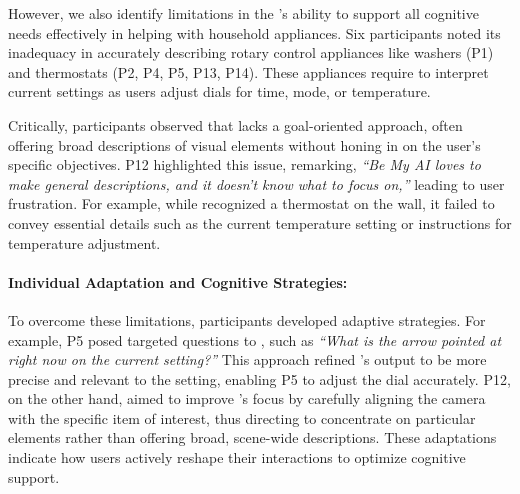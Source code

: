 



However, we also identify limitations in the \bma’s ability to support all cognitive needs effectively in helping with household appliances. Six participants noted its inadequacy in accurately describing rotary control appliances like washers (P1) and thermostats (P2, P4, P5, P13, P14). These appliances require \bma{} to interpret current settings as users adjust dials for time, mode, or temperature. 


Critically, participants observed that \bma{} lacks a goal-oriented approach, often offering broad descriptions of visual elements without honing in on the user's specific objectives. P12 highlighted this issue, remarking, \textit{``Be My AI loves to make general descriptions, and it doesn't know what to focus on,''} leading to user frustration. For example, while \bma{} recognized a thermostat on the wall, it failed to convey essential details such as the current temperature setting or instructions for temperature adjustment. 




\paragraph{Individual Adaptation and Cognitive Strategies:}
To overcome these limitations, participants developed adaptive strategies. For example, P5 posed targeted questions to \bma, such as \textit{``What is the arrow pointed at right now on the current setting?''} This approach refined \bma's output to be more precise and relevant to the setting, enabling P5 to adjust the dial accurately.
% 
P12, on the other hand, aimed to improve \bma's focus by carefully aligning the camera with the specific item of interest, thus directing \bma{} to concentrate on particular elements rather than offering broad, scene-wide descriptions.
% 
These adaptations indicate how users actively reshape their interactions to optimize cognitive support. 

